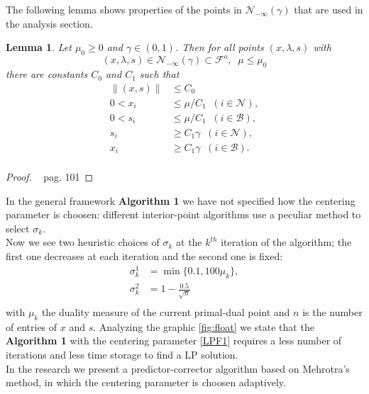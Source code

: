\documentclass[a4paper,10 pt,titlepage,twoside]{book}
\theoremstyle{plain}
\newtheorem{lem}[thm]{Lemma}
\theoremstyle{definition}
\theoremstyle{remark}
\begin{document}
The following lemma shows properties of the points in $\mathcal{N}_{-\infty}(\gamma)$ that are used in the analysis section.
\begin{lem}
	Let $\mu_{0}\geq 0$ and $\gamma\in(0,1)$. Then for all points $(x,\lambda,s)$ with
	\begin{equation*}
	(x,\lambda,s)\in\mathcal{N}_{-\infty}(\gamma)\subset\mathcal{F}^{o}, \;\; \mu \leq \mu_{0}
	\end{equation*}
	there are constants $C_{0}$ and $C_{1}$ such that
\begin{align*}
\lVert(x,s) \rVert&\leq C_{0}\\0< x_{i}&\leq \mu/C_{1}\;\; (i \in\mathcal{N}),\\
0< s_{i}&\leq \mu/C_{1}\;\; (i \in\mathcal{B}),\\ 
s_{i}&\geq C_{1}\gamma \;\; (i \in\mathcal{N}),\\
x_{i}&\geq C_{1}\gamma \;\; (i \in\mathcal{B}).\\
\end{align*}
\end{lem}
\begin{proof}
~\cite{Wright} pag. 101
\end{proof}
In the general framework \textbf{Algorithm 1} we have not specified how the centering parameter is choosen: different interior-point algorithms use a peculiar method to select $\sigma_{k}$.\\
Now we see two heuristic choices of $\sigma_{k}$ at the $k^{th}$ iteration of the algorithm; the first one decreases at each iteration and the second one is fixed: 
\begin{align}
\sigma^{1}_{k} &= \min\{0.1, 100\mu_{k} \},\label{LPF1}\\
\sigma^{2}_{k} &= 1 -\frac{0.5}{\sqrt{n}}\\\label{LPF2}
\end{align}
with $\mu_{k}$ the duality measure of the current primal-dual point and $n$ is the number of entries of $x$ and $s$. 
Analyzing the graphic \ref{fig:float} we state that the \textbf{Algorithm 1} with the centering parameter \ref{LPF1} requires a less number of iterations and less time storage to find a LP solution.\\
In the research we present a predictor-corrector algorithm based on Mehrotra's method, in which the centering parameter is choosen adaptively.\\
\end{document}

